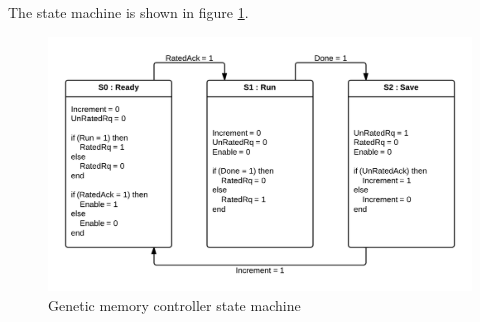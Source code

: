 The state machine is shown in figure \ref{fpga:fig:mem:genetic_memory_ctrl}.

\begin{figure}

  \centering
  \includegraphics[width=\textwidth]{fpga/fig/genetic_ctrl.png}
  \caption{Genetic memory controller state machine}
  \label{fpga:fig:mem:genetic_memory_ctrl}
\end{figure}
